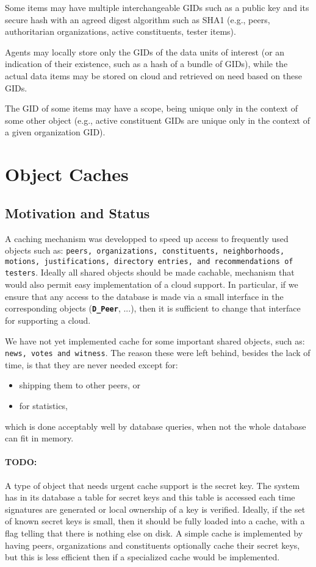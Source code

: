 \documentclass{book}
\newcommand{\cls}[1]{{\tt\bf #1}}
\begin{document}
Some items may have multiple interchangeable GIDs such as a public key and its secure hash with an agreed digest algorithm such as SHA1 (e.g., peers, authoritarian organizations, active constituents, tester items).

Agents may locally store only the GIDs of the data units of interest (or an indication of their existence, such as a hash of a bundle of GIDs),
while the actual data items may be stored on cloud and retrieved on need based on these GIDs.

The GID of some items may have a scope, being unique only in the context of some other object (e.g., active constituent GIDs
are unique only in the context of a given organization GID).

\section{Object Caches}

\subsection{Motivation and Status}
A caching mechanism was developped to speed up access to frequently
used objects such as: {\tt peers, organizations, constituents,
  neighborhoods, motions, justifications, directory entries, and
  recommendations of testers}.  Ideally all shared objects should be
made cachable, mechanism that would also permit easy implementation of
a cloud support.  In particular, if we ensure that any access to the
database is made via a small interface in the corresponding objects
(\cls{D\_Peer}, ...), then it is sufficient to change that interface
for supporting a cloud.

We have not yet implemented cache for some important shared objects,
such as: {\tt news, votes and witness}. The reason these were left behind, besides 
the lack of time, is that they are never needed except for:
\begin{itemize}
\item
shipping them to other peers, or 
\item for statistics, 
\end{itemize}
which is done acceptably well by database queries, when not the whole database
can fit in memory.

\paragraph{TODO:} A type of object that needs urgent cache support is the secret key.
The system has in its database a table for secret keys and this table 
is accessed each time signatures are generated or local ownership of a key
is verified. Ideally, if the set of known secret keys is small, then
it should be fully loaded into a cache, with a flag telling that
there is nothing else on disk. A simple cache is implemented by having peers,
organizations and constituents optionally cache their secret keys,
but this is less efficient then if a specialized cache would be implemented.
\end{document}
